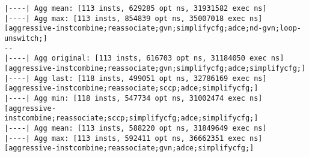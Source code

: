 \documentclass{vldb}
\begin{document}
\begin{lstlisting}[caption={Results of TPC-C Query with Expert Optimizations},label={lst:tpccexpertopt}]
|----| Agg mean: [113 insts, 629285 opt ns, 31931582 exec ns]
|----| Agg max: [113 insts, 854839 opt ns, 35007018 exec ns] [aggressive-instcombine;reassociate;gvn;simplifycfg;adce;nd-gvn;loop-unswitch;]
--
|----| Agg original: [113 insts, 616703 opt ns, 31184050 exec ns] [aggressive-instcombine;reassociate;gvn;simplifycfg;adce;simplifycfg;]
|----| Agg last: [118 insts, 499051 opt ns, 32786169 exec ns] [aggressive-instcombine;reassociate;sccp;adce;simplifycfg;]
|----| Agg min: [118 insts, 547734 opt ns, 31002474 exec ns] [aggressive-instcombine;reassociate;sccp;simplifycfg;adce;simplifycfg;]
|----| Agg mean: [113 insts, 588220 opt ns, 31849649 exec ns]
|----| Agg max: [113 insts, 592411 opt ns, 36662351 exec ns] [aggressive-instcombine;reassociate;gvn;adce;simplifycfg;]
\end{lstlisting}
\end{document}
